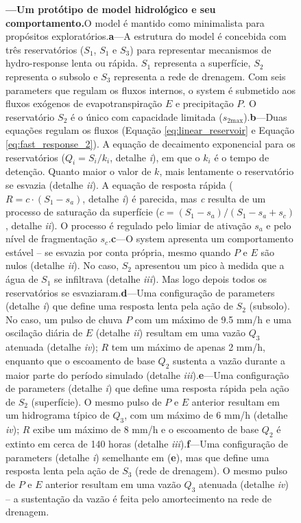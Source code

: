 \documentclass[./main.tex]{subfiles}
\begin{document}
\begin{figure}[t!]
	{\textbf{---\;Um protótipo de \gls{model} hidrológico e seu comportamento.}\;O \gls{model} é mantido como minimalista para propósitos exploratórios.\;\textbf{a}\;---\;A estrutura do \gls{model} é concebida com três reservatórios ($S_1$, $S_1$ e $S_3$) para representar mecanismos de \gls{hydro-response} lenta ou rápida. $S_1$ representa a superfície, $S_2$ representa o subsolo e $S_3$ representa a rede de drenagem. Com seis \gls{parameters} que regulam os fluxos internos, o \gls{system} é submetido aos fluxos exógenos de evapotranspiração $E$ e precipitação $P$. O reservatório $S_2$ é o único com capacidade limitada ($s_\text{2max}$).\;\textbf{b}\;---\;Duas equações regulam os fluxos (Equação \eqref{eq:linear_reservoir} e Equação \eqref{eq:fast_response_2}). A equação de decaimento exponencial para os reservatórios ($Q_i = S_i/k_i$, detalhe \textrm{\textit{i}}), em que o $k_i$ é o tempo de detenção. Quanto maior o valor de $k$, mais lentamente o reservatório se esvazia (detalhe \textrm{\textit{ii}}). A equação de resposta rápida ($R = c\cdot (S_1 - s_a)$, detalhe \textrm{\textit{i}}) é parecida, mas \textit{c} resulta de um processo de saturação da superfície ($c = (S_1 - s_a)/(S_1 - s_a + s_c)$, detalhe \textrm{\textit{ii}}). O processo é regulado pelo limiar de ativação $s_a$ e pelo nível de fragmentação $s_c$.\;\textbf{c}\;---\;O \gls{system} apresenta um comportamento estável -- se esvazia por conta própria, mesmo quando $P$ e $E$ são nulos (detalhe \textrm{\textit{ii}}). No caso, $S_2$ apresentou um pico à medida que a água de $S_1$ se infiltrava (detalhe \textrm{\textit{iii}}). Mas logo depois todos os reservatórios se esvaziaram.\;\textbf{d}\;---\;Uma configuração de \gls{parameters} (detalhe \textrm{\textit{i}}) que define uma resposta lenta pela ação de $S_2$ (subsolo). No caso, um pulso de chuva $P$ com um máximo de 9.5 mm/h e uma oscilação diária de $E$ (detalhe \textrm{\textit{ii}}) resultam em uma vazão $Q_3$ atenuada (detalhe \textrm{\textit{iv}}); $R$ tem um máximo de apenas 2 mm/h, enquanto que o escoamento de base $Q_2$ sustenta a vazão durante a maior parte do período simulado (detalhe \textrm{\textit{iii}}).\;\textbf{e}\;---\;Uma configuração de \gls{parameters} (detalhe \textrm{\textit{i}}) que define uma resposta rápida pela ação de $S_2$ (superfície). O mesmo pulso de $P$ e $E$ anterior resultam em um hidrograma típico de $Q_3$, com um máximo de 6 mm/h (detalhe \textrm{\textit{iv}}); $R$ exibe um máximo de 8 mm/h e o escoamento de base $Q_2$ é extinto em cerca de 140 horas (detalhe \textrm{\textit{iii}}).\;\textbf{f}\;---\;Uma configuração de \gls{parameters} (detalhe \textrm{\textit{i}}) semelhante em (\textbf{e}), mas que define uma resposta lenta pela ação de $S_3$ (rede de drenagem). O mesmo pulso de $P$ e $E$ anterior resultam em uma vazão $Q_3$ atenuada (detalhe \textrm{\textit{iv}}) -- a sustentação da vazão é feita pelo amortecimento na rede de drenagem.
	}
\label{fig:sys:proto}  %
\end{figure}
\end{document}
